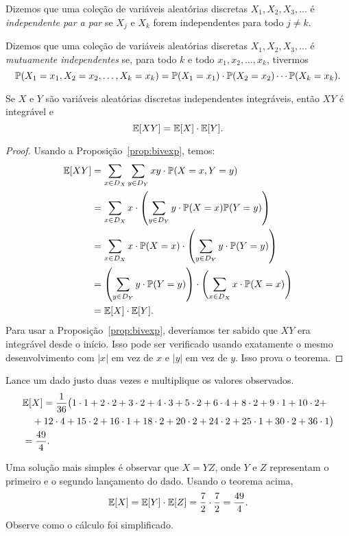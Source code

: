 \begin{definition}
Dizemos que uma coleção de variáveis aleatórias discretas $X_1, X_2, X_3, \dots$ é \emph{independente par a par} se $X_j$ e $X_k$ forem independentes para todo $j \neq k$.
\end{definition}

\begin{definition}
Dizemos que uma coleção de variáveis aleatórias discretas $X_1, X_2, X_3, \dots$ é \emph{mutuamente independentes} se, para todo $k$ e todo $x_1,x_2,\dots,x_k$, tivermos
\[
\mathbb{P}(X_1=x_1,X_2=x_2,\dots,X_k=x_k)
=
\mathbb{P}(X_1=x_1)
\cdot
\mathbb{P}(X_2=x_2)
\cdots
\mathbb{P}(X_k=x_k)
.
\]
\end{definition}

\begin{theorem}
\label{thm:fubini}
Se $X$ e $Y$ são variáveis aleatórias discretas independentes integráveis, então $XY$ é integrável e
\[
\mathbb{E}[XY] = \mathbb{E}[X] \cdot \mathbb{E}[Y].
\]
\end{theorem}

\begin{proof}
Usando a Proposição~\ref{prop:bivexp}, temos:
\begin{align}
\mathbb{E}[XY]
&=
\sum_{x \in D_X } \sum_{y \in D_Y} xy \cdot \mathbb{P}(X=x,Y=y)
\\
&=
\sum_{x \in D_X } x \cdot \left( \sum_{y \in D_Y} y \cdot \mathbb{P}(X=x)\mathbb{P}(Y=y) \right)
\\
&=
\sum_{x \in D_X } x \cdot \mathbb{P}(X=x) \cdot \left( \sum_{y \in D_Y} y \cdot \mathbb{P}(Y=y) \right)
\\
&=
\left( \sum_{y \in D_Y} y \cdot \mathbb{P}(Y=y) \right)
\cdot
\left( \sum_{x \in D_X } x \cdot \mathbb{P}(X=x) \right)
\\
&=
\mathbb{E}[X] \cdot \mathbb{E}[Y].
\end{align}
Para usar a Proposição~\ref{prop:bivexp}, deveríamos ter sabido que $XY$ era integrável desde o início. Isso pode ser verificado usando exatamente o mesmo desenvolvimento com $|x|$ em vez de $x$ e $|y|$ em vez de $y$.
Isso prova o teorema.
\end{proof}

\begin{example}
Lance um dado justo duas vezes e multiplique os valores observados.
\begin{align}
&
\mathbb{E} [X]
=
\frac{1}{36} \big( 1\cdot1 + 2\cdot2 + 3\cdot2 + 4\cdot3 + 5\cdot2 + 6\cdot4
+
8\cdot2 + 9\cdot1 + 10\cdot2
+
\\
&
\quad
+
12\cdot4 + 
15\cdot2 + 16\cdot1
+
18\cdot2 + 20\cdot2 + 24\cdot2 + 25\cdot1 + 30\cdot2 + 
36\cdot1 \big)
\\
&
=
\frac{49}{4}.
\qedhere
\end{align}

Uma solução mais simples é observar que $X = YZ$, onde $Y$ e $Z$ representam o primeiro e o segundo lançamento do dado. Usando o teorema acima,
\[
\mathbb{E} [X] = \mathbb{E} [Y] \cdot \mathbb{E} [Z] = \frac{7}{2} \cdot \frac{7}{2} = \frac{49}{4}
.
\]
Observe como o cálculo foi simplificado.
\end{example}

